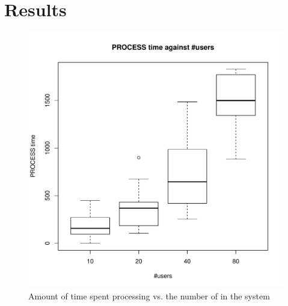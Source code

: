\section{Results}
\label{sec:results}

\begin{figure}[tb]
	\centering
	\includegraphics[width=0.9\linewidth]{vm_state_PROCESS_nbr_users.pdf} 
	\caption{Amount of time spent processing vs. the number of \ues in the system}
	\label{fig:vm_state_PROCESS_nbr_users}
\end{figure}
